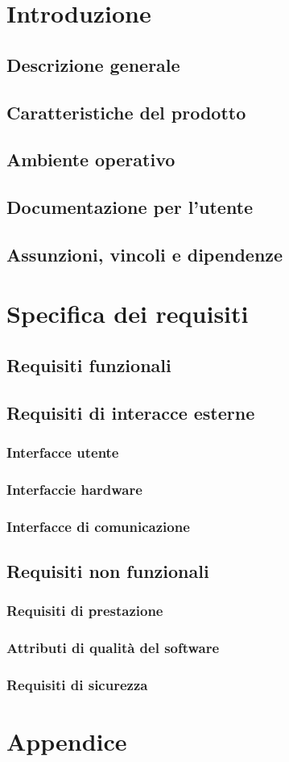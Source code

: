 \documentclass{report}
\begin{document}
\chapter{Introduzione}
\section{Descrizione generale}
\section{Caratteristiche del prodotto}
\section{Ambiente operativo}
\section{Documentazione per l'utente}
\section{Assunzioni, vincoli e dipendenze}

\chapter{Specifica dei requisiti}
\section{Requisiti funzionali}
\section{Requisiti di interacce esterne}
\subsection{Interfacce utente}
\subsection{Interfaccie hardware}
\subsection{Interfacce di comunicazione}
\section{Requisiti non funzionali}
\subsection{Requisiti di prestazione}
\subsection{Attributi di qualità del software}
\subsection{Requisiti di sicurezza}

\chapter{Appendice}
\end{document}
